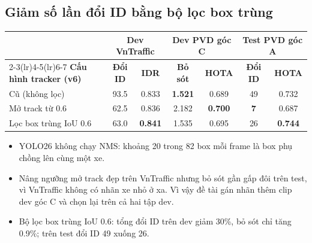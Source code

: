 \documentclass[aspectratio=\mlwAspectRatio, \mlwBaseSize, t]{beamer}
\begin{document}
\subsection{Giảm số lần đổi ID bằng bộ lọc box trùng}
\begin{frame}{\stitle}
  \centering
  \small
  \begin{tabular}{@{}lcccccc@{}}
    \toprule
    & \multicolumn{2}{c}{\textbf{Dev VnTraffic}} & \multicolumn{2}{c}{\textbf{Dev PVD góc C}} &
      \multicolumn{2}{c}{\textbf{Test PVD góc A}} \\
    \cmidrule(lr){2-3}\cmidrule(lr){4-5}\cmidrule(lr){6-7}
    \textbf{Cấu hình tracker (v6)} & \textbf{Đổi ID} & \textbf{IDR} & \textbf{Bỏ sót} & \textbf{HOTA} & \textbf{Đổi ID} &
      \textbf{HOTA} \\
    \midrule
    Cũ (không lọc) & 93.5 & 0.833 & \textbf{1.521} & 0.689 & 49 & 0.732 \\
    Mở track từ 0.6 & 62.5 & 0.836 & 2.182 & \textbf{0.700} & \textbf{7} & 0.687 \\
    \rowcolor{HiRow}
    Lọc box trùng IoU 0.6 & 63.0 & \textbf{0.841} & 1.535 & 0.695 & 26 & \textbf{0.744} \\
    \bottomrule
  \end{tabular}\par
  \vspace{0.5em}
  \begin{itemize}
    \item YOLO26 không chạy NMS: khoảng 20 trong 82 box mỗi frame là \alert{box phụ} chồng lên cùng một xe.
    \item Nâng ngưỡng mở track đẹp trên VnTraffic nhưng \alert{bỏ sót gần gấp đôi} trên test, vì VnTraffic không có nhãn
          xe nhỏ ở xa. Vì vậy đề tài gán nhãn thêm clip dev góc C và chọn lại trên cả hai tập dev.
    \item Bộ lọc box trùng IoU 0.6: tổng đổi ID trên dev giảm 30\%, bỏ sót chỉ tăng 0.9\%; trên test đổi ID 49 xuống 26.
  \end{itemize}
\end{frame}
\end{document}
